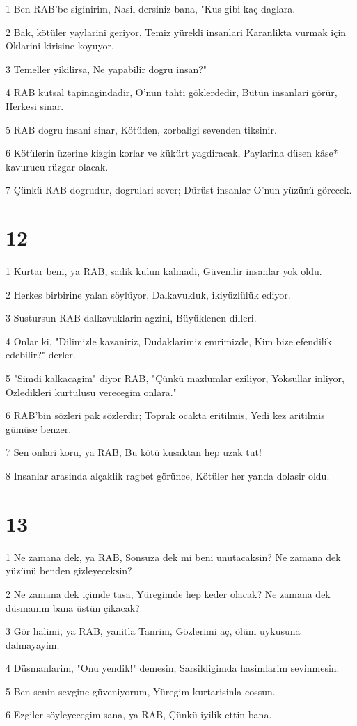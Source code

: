 \par 1 Ben RAB'be siginirim, Nasil dersiniz bana, "Kus gibi kaç daglara.
\par 2 Bak, kötüler yaylarini geriyor, Temiz yürekli insanlari Karanlikta vurmak için Oklarini kirisine koyuyor.
\par 3 Temeller yikilirsa, Ne yapabilir dogru insan?"
\par 4 RAB kutsal tapinagindadir, O'nun tahti göklerdedir, Bütün insanlari görür, Herkesi sinar.
\par 5 RAB dogru insani sinar, Kötüden, zorbaligi sevenden tiksinir.
\par 6 Kötülerin üzerine kizgin korlar ve kükürt yagdiracak, Paylarina düsen kâse* kavurucu rüzgar olacak.
\par 7 Çünkü RAB dogrudur, dogrulari sever; Dürüst insanlar O'nun yüzünü görecek.

\chapter{12}

\par 1 Kurtar beni, ya RAB, sadik kulun kalmadi, Güvenilir insanlar yok oldu.
\par 2 Herkes birbirine yalan söylüyor, Dalkavukluk, ikiyüzlülük ediyor.
\par 3 Sustursun RAB dalkavuklarin agzini, Büyüklenen dilleri.
\par 4 Onlar ki, "Dilimizle kazaniriz, Dudaklarimiz emrimizde, Kim bize efendilik edebilir?" derler.
\par 5 "Simdi kalkacagim" diyor RAB, "Çünkü mazlumlar eziliyor, Yoksullar inliyor, Özledikleri kurtulusu verecegim onlara."
\par 6 RAB'bin sözleri pak sözlerdir; Toprak ocakta eritilmis, Yedi kez aritilmis gümüse benzer.
\par 7 Sen onlari koru, ya RAB, Bu kötü kusaktan hep uzak tut!
\par 8 Insanlar arasinda alçaklik ragbet görünce, Kötüler her yanda dolasir oldu.

\chapter{13}

\par 1 Ne zamana dek, ya RAB, Sonsuza dek mi beni unutacaksin? Ne zamana dek yüzünü benden gizleyeceksin?
\par 2 Ne zamana dek içimde tasa, Yüregimde hep keder olacak? Ne zamana dek düsmanim bana üstün çikacak?
\par 3 Gör halimi, ya RAB, yanitla Tanrim, Gözlerimi aç, ölüm uykusuna dalmayayim.
\par 4 Düsmanlarim, "Onu yendik!" demesin, Sarsildigimda hasimlarim sevinmesin.
\par 5 Ben senin sevgine güveniyorum, Yüregim kurtarisinla cossun.
\par 6 Ezgiler söyleyecegim sana, ya RAB, Çünkü iyilik ettin bana.

